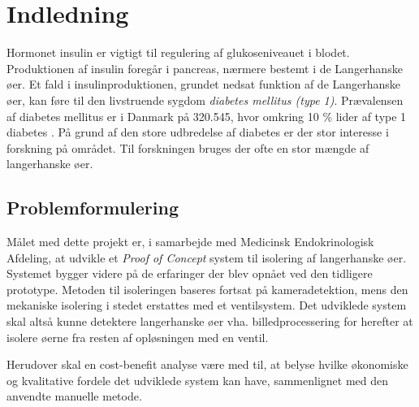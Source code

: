 \chapter{Indledning}
Hormonet insulin er vigtigt til regulering af glukoseniveauet i blodet. Produktionen af insulin foregår i pancreas, nærmere bestemt i de Langerhanske øer. Et fald i insulinproduktionen, grundet nedsat funktion af de Langerhanske øer, kan føre til den livstruende sygdom \textit{diabetes mellitus (type 1)}. Prævalensen af diabetes mellitus er i Danmark på 320.545, hvor omkring 10 \% lider af type 1 diabetes \citep{diabetes}. På grund af den store udbredelse af diabetes er der stor interesse i forskning på området. Til forskningen bruges der ofte en stor mængde af langerhanske øer. 





\section{Problemformulering}

Målet med dette projekt er, i samarbejde med Medicinsk Endokrinologisk Afdeling, at udvikle et \textit{Proof of Concept} system til isolering af langerhanske øer. Systemet bygger videre på de erfaringer der blev opnået ved den tidligere prototype. Metoden til isoleringen baseres fortsat på kameradetektion, mens den mekaniske isolering i stedet erstattes med et ventilsystem. Det udviklede system skal altså kunne detektere langerhanske øer vha. billedprocessering for herefter at isolere øerne fra resten af opløsningen med en ventil. 

Herudover skal en cost-benefit analyse være med til, at belyse hvilke økonomiske og kvalitative fordele det udviklede system kan have, sammenlignet med den anvendte manuelle metode.

